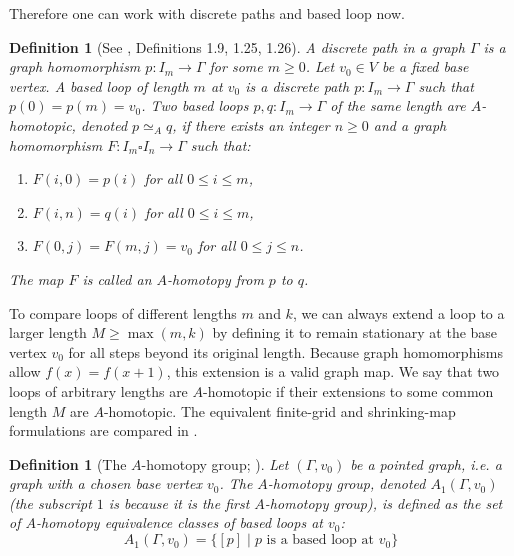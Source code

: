\documentclass{amsart}
\newtheorem{definition}[theorem]{Definition}
\begin{document}
Therefore one can work with discrete paths and  based loop now. 
\begin{definition}[See \cite{kapulkin_grupoid}, Definitions 1.9, 1.25, 1.26]
A \textit{discrete path} in a graph $\Gamma$ is a graph homomorphism $p : I_m \to \Gamma$ for some $m \ge 0$.  Let $v_0 \in V$ be a fixed base vertex. A \textit{based loop} of length $m$ at $v_0$ is a discrete path $p : I_m \to \Gamma$ such that $p(0) = p(m) = v_0$. 
Two based loops $p, q \colon I_m \to \Gamma$ of the same length are \textit{$A$-homotopic}, denoted $p \simeq_A q$, if there exists an integer $n \ge 0$ and a graph homomorphism $F \colon I_m \square I_n \to \Gamma$ such that:
\begin{enumerate}
    \item[{\rm (i).}] $F(i, 0) = p(i)$ for all $0 \le i \le m$,
    \item[{\rm (ii).}] $F(i, n) = q(i)$ for all $0 \le i \le m$,
    \item[{\rm (iii).}] $F(0, j) = F(m, j) = v_0$ for all $0 \le j \le n$.
\end{enumerate}
The map $F$ is called an \textit{$A$-homotopy} from $p$ to $q$.
\end{definition}

To compare loops of different lengths $m$ and $k$, we can always extend a loop to a larger length $M \ge \max(m, k)$ by defining it to remain stationary at the base vertex $v_0$ for all steps beyond its original length. Because graph homomorphisms allow $f(x) = f(x+1)$, this extension is a valid graph map. We say that two loops of arbitrary lengths are $A$-homotopic if their extensions to some common length $M$ are $A$-homotopic. The equivalent finite-grid and shrinking-map formulations are compared in \cite[Section~2, especially Theorem~2.14]{kapulkin_grupoid}.

\begin{definition}[{The $A$-homotopy group; \cite[Definition~2.4]{Babson2006}}]
Let $(\Gamma, v_0)$ be a pointed graph, i.e. a graph with a chosen base vertex $v_0$. The \textit{$A$-homotopy group}, denoted $A_1(\Gamma, v_0)$ (the subscript $1$ is because it is the \textit{first} $A$-homotopy group), is defined as the set of $A$-homotopy equivalence classes of based loops at $v_0$:
\[
A_1(\Gamma, v_0) = \{ [p] \mid p \text{ is a based loop at } v_0 \}
\]
\end{definition}
\end{document}
